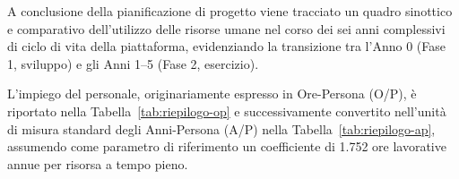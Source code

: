 A conclusione della pianificazione di progetto viene tracciato un quadro sinottico e comparativo dell'utilizzo delle risorse umane nel corso dei sei anni complessivi di ciclo di vita della piattaforma, evidenziando la transizione tra l'Anno 0 (Fase 1, sviluppo) e gli Anni 1--5 (Fase 2, esercizio).

L'impiego del personale, originariamente espresso in Ore-Persona (O/P), è riportato nella Tabella~\ref{tab:riepilogo-op} e successivamente convertito nell'unità di misura standard degli Anni-Persona (A/P) nella Tabella~\ref{tab:riepilogo-ap}, assumendo come parametro di riferimento un coefficiente di 1.752 ore lavorative annue per risorsa a tempo pieno.

\begin{table}[H]
\centering
\small
{}
\caption{Impegno annuale del personale in Ore-Persona}
\label{tab:riepilogo-op}
\end{table}

